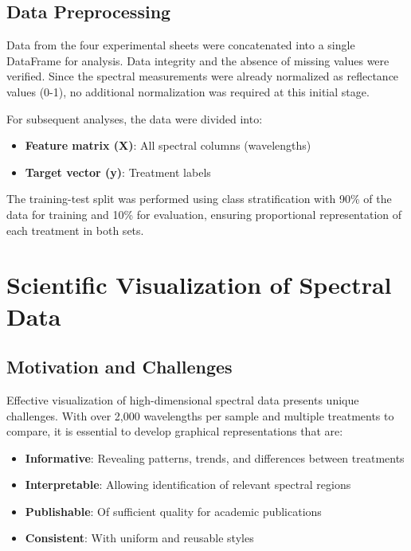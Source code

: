 \documentclass[12pt,a4paper]{article}
\begin{document}
\subsection{Data Preprocessing}

Data from the four experimental sheets were concatenated into a single DataFrame for analysis. Data integrity and the absence of missing values were verified. Since the spectral measurements were already normalized as reflectance values (0-1), no additional normalization was required at this initial stage.

For subsequent analyses, the data were divided into:
\begin{itemize}
    \item \textbf{Feature matrix (X)}: All spectral columns (wavelengths)
    \item \textbf{Target vector (y)}: Treatment labels
\end{itemize}

The training-test split was performed using class stratification with 90\% of the data for training and 10\% for evaluation, ensuring proportional representation of each treatment in both sets.

\newpage
\section{Scientific Visualization of Spectral Data}
\label{sec:visualization}

\subsection{Motivation and Challenges}

Effective visualization of high-dimensional spectral data presents unique challenges. With over 2,000 wavelengths per sample and multiple treatments to compare, it is essential to develop graphical representations that are:

\begin{itemize}
    \item \textbf{Informative}: Revealing patterns, trends, and differences between treatments
    \item \textbf{Interpretable}: Allowing identification of relevant spectral regions
    \item \textbf{Publishable}: Of sufficient quality for academic publications
    \item \textbf{Consistent}: With uniform and reusable styles
\end{itemize}
\end{document}

